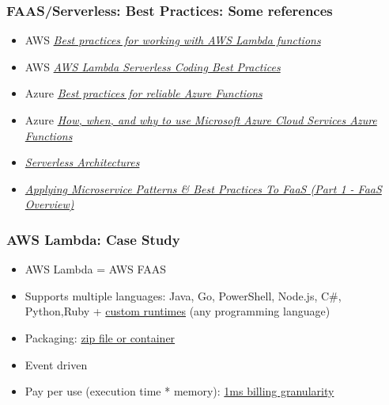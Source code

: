 \documentclass[11pt,aspectratio=169]{beamer}
\begin{document}
\begin{nrcanFrame}
  \frametitle{FAAS/Serverless: Best Practices: Some references}
  \begin{itemize}
  \item AWS
    \textit{\href{https://docs.aws.amazon.com/lambda/latest/dg/best-practices.html}
      {Best practices for working with AWS Lambda functions}}

  \item AWS
    \textit{\href{https://www.intentsg.com/aws-lambda-serverless-coding-best-practices/}
      {AWS Lambda Serverless Coding Best Practices}}

  \item Azure
    \textit{\href{https://docs.microsoft.com/en-us/azure/azure-functions/functions-best-practices?tabs=csharp}
      {Best practices for reliable Azure Functions}}

  \item Azure
    \textit{\href{https://www.devbridge.com/articles/how-when-and-why-to-use-microsoft-azure-cloud-services/}
      {How, when, and why to use Microsoft Azure Cloud Services Azure Functions}}

    \item
      \textit{\href{https://martinfowler.com/articles/serverless.html}
        {Serverless Architectures}}
      
  \item
    \textit{\href{https://www.captechconsulting.com/blogs/applying-microservice-patterns-best-practices-to-faas-part-1-faas-overview}
      {Applying Microservice Patterns \& Best Practices To FaaS (Part 1 - FaaS Overview)}}
    \end{itemize}
\end{nrcanFrame}



\begin{nrcanFrame}
  \frametitle{AWS Lambda: Case Study}
  \begin{itemize}
  \item AWS Lambda  = AWS FAAS
  \item Supports multiple languages: Java, Go, PowerShell, Node.js, C\#, Python,Ruby + \href{https://docs.aws.amazon.com/lambda/latest/dg/runtimes-custom.html}{custom runtimes} (any programming language)
  \item Packaging:
    \href{https://docs.aws.amazon.com/lambda/latest/dg/gettingstarted-package.html}
    {zip file or container}
  \item Event driven
  \item Pay per use (execution time * memory): \href{https://aws.amazon.com/blogs/aws/new-for-aws-lambda-1ms-billing-granularity-adds-cost-savings/}{1ms billing granularity}
  \end{itemize}
\end{nrcanFrame}
\end{document}
